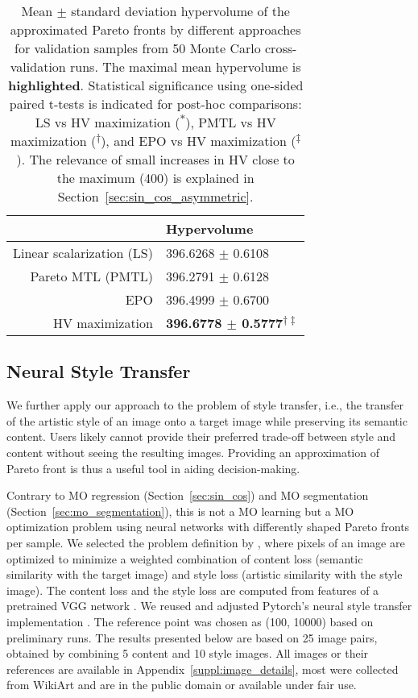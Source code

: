 \begin{table}[]
\renewcommand{\arraystretch}{1.5}
\centering
\caption{\small{Mean $\pm$ standard deviation hypervolume of the approximated Pareto fronts by different approaches for validation samples from 50 Monte Carlo cross-validation runs. The maximal mean hypervolume is \textbf{highlighted}. Statistical significance using one-sided paired t-tests is indicated for post-hoc comparisons: LS vs HV maximization (\textsuperscript{$\ast$}), PMTL vs HV maximization (\textsuperscript{$\dagger$}), and EPO vs HV maximization (\textsuperscript{$\ddagger$}). The relevance of small increases in HV close to the maximum (400) is explained in Section~\ref{sec:sin_cos_asymmetric}.
}}
\label{tab:HV_mo_segmentation}
\begin{tabular}{rl}
\toprule
\textbf{} & \textbf{Hypervolume}\\
\midrule
\small Linear scalarization (LS) & \footnotesize 396.6268 $\pm$ 0.6108\\
\small Pareto MTL (PMTL) & \footnotesize 396.2791 $\pm$ 0.6128\\
\small EPO & \footnotesize 396.4999 $\pm$ 0.6700\\
\small HV maximization & \footnotesize \textbf{396.6778 $\pm$ 0.5777\textsuperscript{$\dagger \ddagger$}}\\
\bottomrule
\end{tabular}
\end{table}

\subsection{Neural Style Transfer}
\label{sec:style_transfer}
We further apply our approach to the problem of style transfer, i.e., the transfer of the artistic style of an image onto a target image while preserving its semantic content. Users likely cannot provide their preferred trade-off between style and content without seeing the resulting images. Providing an approximation of Pareto front is thus a useful tool in aiding decision-making.

Contrary to MO regression (Section~\ref{sec:sin_cos}) and MO segmentation (Section~\ref{sec:mo_segmentation}), this is not a MO learning but a MO optimization problem using neural networks with differently shaped Pareto fronts per sample. We selected the problem definition by \cite{gatys2016image}, where pixels of an image are optimized to minimize a weighted combination of content loss (semantic similarity with the target image) and style loss (artistic similarity with the style image). The content loss and the style loss are computed from features of a pretrained VGG network \citep{Simonyan15}. We reused and adjusted Pytorch's neural style transfer implementation \citep{pytorch_style_tutorial}. The reference point was chosen as (100, 10000) based on preliminary runs. %
The results presented below are based on 25 image pairs, obtained by combining 5 content and 10 style images. All images or their references are available in Appendix~\ref{suppl:image_details}, most were collected from WikiArt \citep{wikiart} and are in the public domain or available under fair use.

